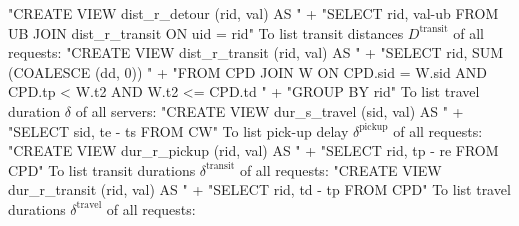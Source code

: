 \nwenddocs{}\endmoddef{}
"CREATE VIEW dist_r_detour (rid, val) AS "
  + "SELECT rid, val-ub FROM UB JOIN dist_r_transit ON uid = rid"
\nwendcode{}\nwdocspar
To list transit distances $D^\textrm{transit}$ of all requests:
\nwenddocs{}\endmoddef{}
"CREATE VIEW dist_r_transit (rid, val) AS "
  + "SELECT rid, SUM (COALESCE (dd, 0)) "
  + "FROM CPD JOIN W ON CPD.sid = W.sid AND CPD.tp < W.t2 AND W.t2 <= CPD.td "
  + "GROUP BY rid"
\nwendcode{}\nwdocspar
To list travel duration $\delta$ of all servers:
\nwenddocs{}\endmoddef{}
"CREATE VIEW dur_s_travel (sid, val) AS "
  + "SELECT sid, te - ts FROM CW"
\nwendcode{}\nwdocspar
To list pick-up delay $\delta^\textrm{pickup}$ of all requests:
\nwenddocs{}\endmoddef{}
"CREATE VIEW dur_r_pickup (rid, val) AS "
  + "SELECT rid, tp - re FROM CPD"
\nwendcode{}\nwdocspar
To list transit durations $\delta^\textrm{transit}$ of all requests:
\nwenddocs{}\endmoddef{}
"CREATE VIEW dur_r_transit (rid, val) AS "
  + "SELECT rid, td - tp FROM CPD"
\nwendcode{}\nwdocspar
To list travel durations $\delta^\textrm{travel}$ of all requests:
\nwenddocs{}\endmoddef{}
